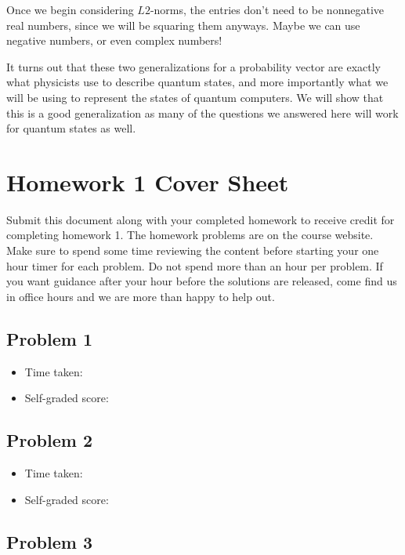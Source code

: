 \documentclass[letterpaper, 12pt]{article}
\newcommand{\1}{\mathds{1}}	%
\theoremstyle{definition}
\begin{document}
Once we begin considering $L2$-norms, the entries don't need to be nonnegative real numbers, since we will be squaring them anyways. Maybe we can use negative numbers, or even complex numbers! 

It turns out that these two generalizations for a probability vector are exactly what physicists use to describe quantum states, and more importantly what we will be using to represent the states of quantum computers. We will show that this is a good generalization as many of the questions we answered here will work for quantum states as well. 

\newpage 

\section{Homework 1 Cover Sheet}

Submit this document along with your completed homework to receive credit for completing homework 1. The homework problems are on the course website. Make sure to spend some time reviewing the content before starting your one hour timer for each problem. Do not spend more than an hour per problem. If you want guidance after your hour before the solutions are released, come find us in office hours and we are more than happy to help out. 

\subsection{Problem 1}

\begin{itemize}
    \item Time taken: 
    \item Self-graded score: 
\end{itemize}

\subsection{Problem 2}

\begin{itemize}
    \item Time taken: 
    \item Self-graded score: 
\end{itemize}

\subsection{Problem 3}
\end{document}
